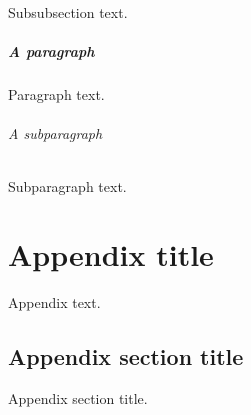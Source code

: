 \documentclass{amsbook}
\begin{document}
Subsubsection text.

\paragraph{A paragraph}
\label{ref:par}

Paragraph text.

\subparagraph{A subparagraph}
\label{ref:subpar}

Subparagraph text.

\appendix

\chapter{Appendix title}
\label{ref:app}

Appendix text.

\section{Appendix section title}
\label{ref:appsec}

Appendix section title.
\end{document}
